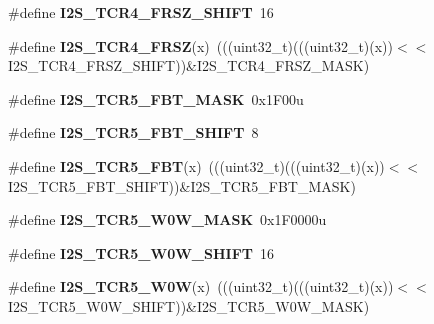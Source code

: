 \begin{DoxyCompactItemize}
\item 
\#define {\bfseries I2\+S\+\_\+\+T\+C\+R4\+\_\+\+F\+R\+S\+Z\+\_\+\+S\+H\+I\+FT}~16\hypertarget{group__I2S__Register__Masks_ga7db678baf12c9937bc1f2899876ed142}{}\label{group__I2S__Register__Masks_ga7db678baf12c9937bc1f2899876ed142}

\item 
\#define {\bfseries I2\+S\+\_\+\+T\+C\+R4\+\_\+\+F\+R\+SZ}(x)~(((uint32\+\_\+t)(((uint32\+\_\+t)(x))$<$$<$I2\+S\+\_\+\+T\+C\+R4\+\_\+\+F\+R\+S\+Z\+\_\+\+S\+H\+I\+FT))\&I2\+S\+\_\+\+T\+C\+R4\+\_\+\+F\+R\+S\+Z\+\_\+\+M\+A\+SK)\hypertarget{group__I2S__Register__Masks_gaadb8adc59ed93d7a11923941424e20e5}{}\label{group__I2S__Register__Masks_gaadb8adc59ed93d7a11923941424e20e5}

\item 
\#define {\bfseries I2\+S\+\_\+\+T\+C\+R5\+\_\+\+F\+B\+T\+\_\+\+M\+A\+SK}~0x1\+F00u\hypertarget{group__I2S__Register__Masks_ga95e32e5df1218cb76b09a99f46d9eca2}{}\label{group__I2S__Register__Masks_ga95e32e5df1218cb76b09a99f46d9eca2}

\item 
\#define {\bfseries I2\+S\+\_\+\+T\+C\+R5\+\_\+\+F\+B\+T\+\_\+\+S\+H\+I\+FT}~8\hypertarget{group__I2S__Register__Masks_gaaeadb079b059ec5d832aa9bce021f0ab}{}\label{group__I2S__Register__Masks_gaaeadb079b059ec5d832aa9bce021f0ab}

\item 
\#define {\bfseries I2\+S\+\_\+\+T\+C\+R5\+\_\+\+F\+BT}(x)~(((uint32\+\_\+t)(((uint32\+\_\+t)(x))$<$$<$I2\+S\+\_\+\+T\+C\+R5\+\_\+\+F\+B\+T\+\_\+\+S\+H\+I\+FT))\&I2\+S\+\_\+\+T\+C\+R5\+\_\+\+F\+B\+T\+\_\+\+M\+A\+SK)\hypertarget{group__I2S__Register__Masks_gae719019b98cc529d200d8570f3b62f05}{}\label{group__I2S__Register__Masks_gae719019b98cc529d200d8570f3b62f05}

\item 
\#define {\bfseries I2\+S\+\_\+\+T\+C\+R5\+\_\+\+W0\+W\+\_\+\+M\+A\+SK}~0x1\+F0000u\hypertarget{group__I2S__Register__Masks_ga8c6552a52f0e99068ae8869056e78ccb}{}\label{group__I2S__Register__Masks_ga8c6552a52f0e99068ae8869056e78ccb}

\item 
\#define {\bfseries I2\+S\+\_\+\+T\+C\+R5\+\_\+\+W0\+W\+\_\+\+S\+H\+I\+FT}~16\hypertarget{group__I2S__Register__Masks_ga0b9f1161cd97d2be7e9ee7f680293e3d}{}\label{group__I2S__Register__Masks_ga0b9f1161cd97d2be7e9ee7f680293e3d}

\item 
\#define {\bfseries I2\+S\+\_\+\+T\+C\+R5\+\_\+\+W0W}(x)~(((uint32\+\_\+t)(((uint32\+\_\+t)(x))$<$$<$I2\+S\+\_\+\+T\+C\+R5\+\_\+\+W0\+W\+\_\+\+S\+H\+I\+FT))\&I2\+S\+\_\+\+T\+C\+R5\+\_\+\+W0\+W\+\_\+\+M\+A\+SK)\hypertarget{group__I2S__Register__Masks_ga5b0a26e0153652855de151bbbc7e8303}{}\label{group__I2S__Register__Masks_ga5b0a26e0153652855de151bbbc7e8303}


\end{DoxyCompactItemize}
